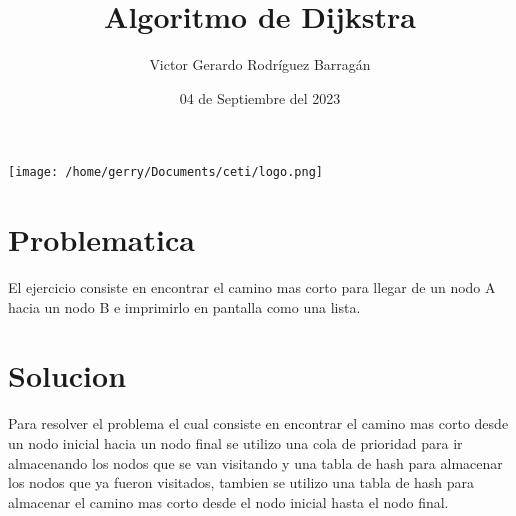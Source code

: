 \documentclass{article}
\title{Algoritmo de Dijkstra}
\author{Victor Gerardo Rodríguez Barragán}
\date{04 de Septiembre del 2023}
\begin{document}
\maketitle
\begin{center}
    \texttt{[image: /home/gerry/Documents/ceti/logo.png]}
\end{center}

\newpage
\justify
\section*{Problematica}
El ejercicio consiste en encontrar el camino mas corto para llegar de un nodo A hacia un nodo B e
imprimirlo en pantalla como una lista.

\section*{Solucion}
Para resolver el problema el cual consiste en encontrar el
camino mas corto desde un nodo inicial hacia un nodo final se utilizo una cola de
prioridad para ir almacenando los nodos que se van visitando y una tabla de hash para almacenar
los nodos que ya fueron visitados, tambien se utilizo una tabla de hash para almacenar el camino
mas corto desde el nodo inicial hasta el nodo final.
\end{document}
